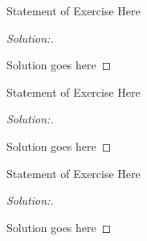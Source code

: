 \documentclass[12pt]{article}
\newenvironment{exercise}[2][Exercise]{\begin{trivlist}
\item[\hskip \labelsep {\bfseries #1}\hskip \labelsep {\bfseries #2}]}{\end{trivlist}}
\newenvironment{solution}[1][Solution]{\begin{proof}
		[#1:\nopunct]$ $\par\nobreak\ignorespaces}{\end{proof}}
\begin{document}
\begin{exercise}{1}
Statement of Exercise Here
\end{exercise}

\begin{solution}
	Solution goes here
\end{solution}

\begin{exercise}{2}
	Statement of Exercise Here
\end{exercise}

\begin{solution}
	Solution goes here
\end{solution}

\begin{exercise}{3}
	Statement of Exercise Here
\end{exercise}

\begin{solution}
	Solution goes here
\end{solution}
\end{document}
